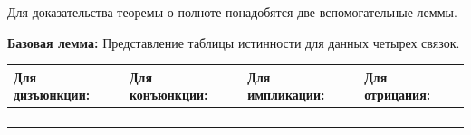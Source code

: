 \par \noindent Для доказательства теоремы о полноте понадобятся две вспомогательные леммы.

\textbf{Базовая лемма:} Представление таблицы истинности для данных четырех связок.

\begin{tabular}{|p{1.5in}|p{1.5in}|p{1.5in}|p{1.5in}|}
\hline
    Для дизъюнкции: & Для конъюнкции: & Для импликации: & Для отрицания:\\ 
    \hline
    \centering{$A,B \vdash A\lor B$} & \centering{$A,B \vdash A \land B$} & \centering{$A,B \vdash A\to B$} & \centering{$A \vdash \neg (\neg A)$} \tabularnewline
    
    \centering{$\neg A,B \vdash A\lor B$} & \centering{$\neg A,B \vdash \neg (A\land B)$} & \centering{$\neg A,B \vdash A\to B$}& \centering{$\neg A \vdash \neg A$} \tabularnewline
    
    \centering{$A,\neg B \vdash A\lor B$} & \centering{$A, \neg B \vdash \neg (A\land B)$} & \centering{$A,\neg B \vdash \neg (A\to B)$}& \centering{} \tabularnewline
    
    \centering{$\neg A,\neg B \vdash \neg (A\lor B)$} & \centering{$\neg A, \neg B \vdash \neg (A\land B)$} & \centering{$\neg A,\neg B \vdash A\to B$}& \centering{} \tabularnewline
    \hline
\end{tabular}

